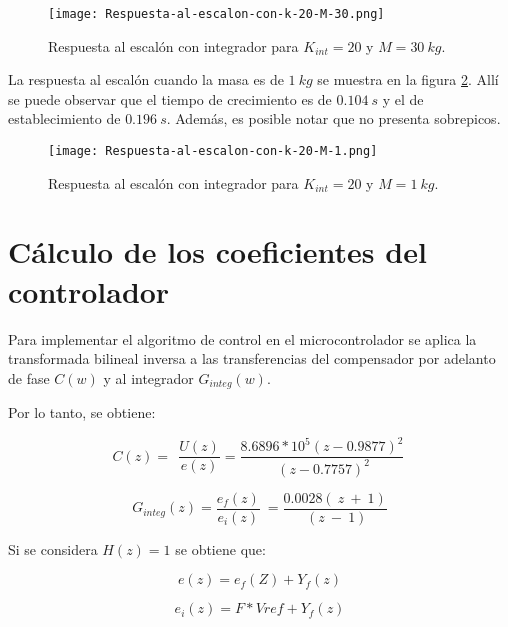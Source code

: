 \begin{figure}[H]
	\centering
	\texttt{[image: Respuesta-al-escalon-con-k-20-M-30.png]}
	\caption{Respuesta al escalón con integrador para $K_{int} =20$ y $M = 30\:kg$.}
	\label{fig:respuesta-al-escalon-con-k-20-M-30}
\end{figure}


 La respuesta al escal\'{o}n cuando la masa es de $1\:kg$ se muestra en la figura \ref{fig:respuesta-al-escalon-con-k-20-M-1}. All\'{i} se puede observar que el tiempo de crecimiento es de $0.104\:s$ y el de establecimiento de $0.196\:s$. Adem\'{a}s, es posible notar que no presenta sobrepicos.



\begin{figure}[H]
	\centering
	\texttt{[image: Respuesta-al-escalon-con-k-20-M-1.png]}
	\caption{Respuesta al escalón con integrador para $K_{int} =20$ y $M=1\:kg$.}
	\label{fig:respuesta-al-escalon-con-k-20-M-1}
\end{figure}


\section{Cálculo de los coeficientes del controlador}

 Para implementar el algoritmo de control en el microcontrolador se aplica la transformada bilineal inversa a las transferencias del compensador por adelanto de fase $C(w)$ y al integrador $G_{integ}(w)$.

 Por lo tanto, se obtiene:

\begin{equation} \label{GrindEQ__5_6_} 
	C(z)=\ \ \frac{U(z)}{e(z)}=\frac{8.6896*10^5(z-0.9877)^2}{\ (z-0.7757)^2}\  
\end{equation} 

\begin{equation} \label{GrindEQ__5_7_} 
	G_{integ}(z)=\frac{e_f(z)}{e_i(z)}\ =\frac{0.0028(\ z\ +\ 1)}{\ (z\ -\ 1)} 
\end{equation} 

 Si se considera $H(z)=1$ se obtiene que:

\begin{equation} \label{GrindEQ__5_39_} 
	e(z)=e_f(Z)+Y_f(z) 
\end{equation} 

\begin{equation} \label{GrindEQ__5_40_} 
	e_i(z)=F*Vref+Y_f(z) 
\end{equation} 


